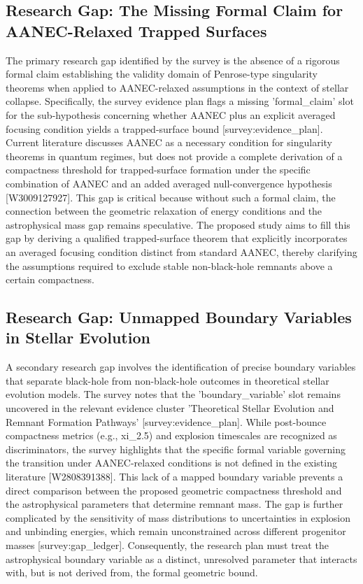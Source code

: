 \documentclass[conference]{IEEEtran}
\begin{document}
\subsection{Research Gap: The Missing Formal Claim for AANEC-Relaxed Trapped Surfaces}
The primary research gap identified by the survey is the absence of a rigorous formal claim establishing the validity domain of Penrose-type singularity theorems when applied to AANEC-relaxed assumptions in the context of stellar collapse. Specifically, the survey evidence plan flags a missing 'formal\_claim' slot for the sub-hypothesis concerning whether AANEC plus an explicit averaged focusing condition yields a trapped-surface bound [survey:evidence\_plan]. Current literature discusses AANEC as a necessary condition for singularity theorems in quantum regimes, but does not provide a complete derivation of a compactness threshold for trapped-surface formation under the specific combination of AANEC and an added averaged null-convergence hypothesis [W3009127927]. This gap is critical because without such a formal claim, the connection between the geometric relaxation of energy conditions and the astrophysical mass gap remains speculative. The proposed study aims to fill this gap by deriving a qualified trapped-surface theorem that explicitly incorporates an averaged focusing condition distinct from standard AANEC, thereby clarifying the assumptions required to exclude stable non-black-hole remnants above a certain compactness.

\subsection{Research Gap: Unmapped Boundary Variables in Stellar Evolution}
A secondary research gap involves the identification of precise boundary variables that separate black-hole from non-black-hole outcomes in theoretical stellar evolution models. The survey notes that the 'boundary\_variable' slot remains uncovered in the relevant evidence cluster 'Theoretical Stellar Evolution and Remnant Formation Pathways' [survey:evidence\_plan]. While post-bounce compactness metrics (e.g., xi\_2.5) and explosion timescales are recognized as discriminators, the survey highlights that the specific formal variable governing the transition under AANEC-relaxed conditions is not defined in the existing literature [W2808391388]. This lack of a mapped boundary variable prevents a direct comparison between the proposed geometric compactness threshold and the astrophysical parameters that determine remnant mass. The gap is further complicated by the sensitivity of mass distributions to uncertainties in explosion and unbinding energies, which remain unconstrained across different progenitor masses [survey:gap\_ledger]. Consequently, the research plan must treat the astrophysical boundary variable as a distinct, unresolved parameter that interacts with, but is not derived from, the formal geometric bound.
\end{document}
